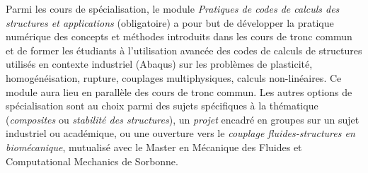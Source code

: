 \documentclass[french,11pt]{article}
\begin{document}
Parmi les cours de spécialisation, le module \emph{Pratiques de codes de calculs des structures et applications} (obligatoire) a pour but de développer la pratique numérique des concepts et méthodes introduits dans les cours de tronc commun et de former les étudiants à l'utilisation avancée des codes de calculs de structures utilisés en contexte industriel ({Abaqus}) sur les problèmes de plasticité, homogénéisation, rupture, couplages multiphysiques, calculs non-linéaires. Ce module aura lieu en parallèle des cours de tronc commun.
Les autres options de spécialisation  sont au choix parmi des sujets spécifiques à la thématique (\emph{composites} ou \emph{stabilité des structures}),  un \emph{projet} encadré en groupes  sur un sujet industriel ou académique, ou une ouverture vers le \emph{couplage fluides-structures en biomécanique}, mutualisé avec le Master en Mécanique des Fluides et Computational Mechanics de Sorbonne.
\end{document}

